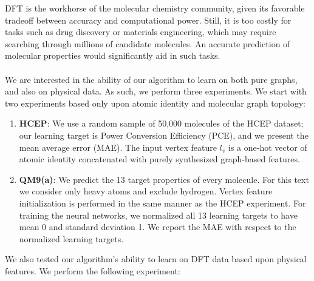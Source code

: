 \documentclass[sigchi]{acmart}
\theoremstyle{definition}
\theoremstyle{theorem}
\theoremstyle{corollary}
\theoremstyle{lemma}
\theoremstyle{remark}
\theoremstyle{prop}
\begin{document}
DFT \citep{HohenbergKohn1964,KohnSham1965} is the workhorse of the molecular chemistry community, given its favorable tradeoff between accuracy and computational power. Still, it is too costly for tasks such as drug discovery or materials engineering, which may require searching through millions of candidate molecules. An accurate prediction of molecular properties would significantly aid in such tasks. \\ \\
We are interested in the ability of our algorithm to learn on both pure graphs, and also on physical data. As such, we perform three experiments. We start with two experiments based only upon atomic identity and molecular graph topology:
\begin{enumerate}
\item \textbf{HCEP}: We use a random sample of 50,000 molecules of the HCEP dataset; our learning target is Power Conversion Efficiency (PCE), and we present the mean average error (MAE). The input vertex feature $l_v$ is a one-hot vector of atomic identity concatenated with purely synthesized graph-based features.
\item \textbf{QM9(a)}: We predict the 13 target properties of every molecule. For this text we consider only heavy atoms and exclude hydrogen. Vertex feature initialization is performed in the same manner as the HCEP experiment. For training the neural networks, we normalized all 13 learning targets to have mean 0 and standard deviation 1. We report the MAE with respect to the normalized learning targets.
\end{enumerate}
We also tested our algorithm's ability to learn on DFT data based upon physical features. We perform the following experiment:
\end{document}

